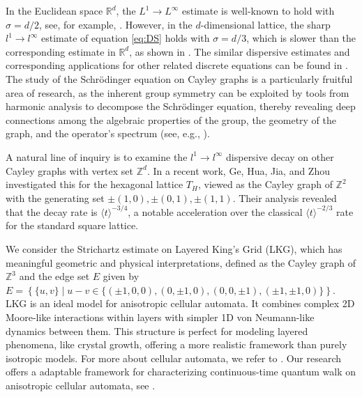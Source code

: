 \documentclass[12pt]{amsart}
\newcommand{\R}{\mathbb{R}}
\newcommand{\Z}{\mathbb{Z}}
\begin{document}
In the Euclidean space $\R^d$, the $L^1 \to L^{\infty}$ estimate is well-known to hold with $\sigma = d/2$, see, for example, \cite{S77, T06}. However, in the $d$-dimensional lattice, the sharp $l^1 \to l^{\infty}$ estimate of equation \eqref{eq:DS} holds with $\sigma = d/3$, which is slower than the corresponding estimate in $\R^d$, as shown in \cite[Proposition 1]{SK05}. The similar dispersive estimates and corresponding applications for other related discrete equations can be found in \cite{B13, CT09, EKT15, CI21, KPS09, MP12, PS08}.  The study of the Schr\"odinger equation on Cayley graphs is a particularly fruitful area of research, as the inherent group symmetry can be exploited by tools from harmonic analysis to decompose the Schrödinger equation, thereby revealing deep connections among the algebraic properties of the group, the geometry of the graph, and the operator's spectrum (see, e.g., \cite{CT09, EKT15, SK05, PS08, GHJZ25}).
	
	A natural line of inquiry is to examine the $l^1 \to l^{\infty}$ dispersive decay on other Cayley graphs with vertex set  $\mathbb{Z}^d$. In a recent work, Ge, Hua, Jia, and Zhou \cite{GHJZ25} investigated this for the hexagonal lattice $T_H$, viewed as the Cayley graph of $\mathbb{Z}^2$ with the generating set ${\pm(1,0), \pm(0,1), \pm(1,1)}$. Their analysis revealed that the decay rate is $\langle t \rangle^{-3/4}$, a notable acceleration over the classical $\langle t \rangle^{-2/3}$ rate for the standard square lattice. 
	
	
	
	We consider the Strichartz estimate on Layered King's Grid  (LKG), which has  meaningful geometric and physical interpretations, defined as the Cayley graph of $\Z^3$ and the edge set $E$ given by $E = \left\{ \{u, v\} \mid u - v \in \{(\pm 1,0,0),(0,\pm 1,0), (0,0,\pm1),  (\pm 1,\pm 1,0)\} \right\}$.  LKG is an ideal model for anisotropic cellular automata. It combines complex 2D Moore-like interactions within layers with simpler 1D von Neumann-like dynamics between them. This structure is perfect for modeling layered phenomena, like crystal growth, offering a more realistic framework than purely isotropic models. For more about cellular automata, we refer to \cite{CC10, TM95, W00}.
	Our research offers a adaptable framework for characterizing continuous-time quantum walk on anisotropic cellular automata, see \cite{S08}.
\end{document}
